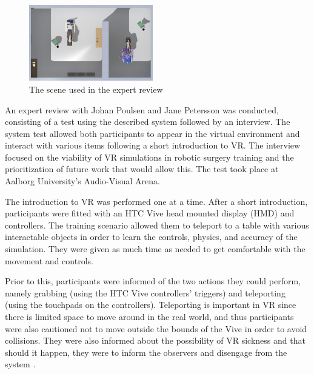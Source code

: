 \documentclass[conference]{IEEEtran}
\begin{document}
\begin{figure}[tp]
\centering
\includegraphics[width=0.48\textwidth]{Figures/Scene.PNG}
\caption{The scene used in the expert review}
\label{fig:scene}
\end{figure}

An expert review with Johan Poulsen and Jane Petersson was conducted, consisting of a test using the described system followed by an interview. The system test allowed both participants to appear in the virtual environment and interact with various items following a short introduction to VR. The interview focused on the viability of VR simulations in robotic surgery training and the prioritization of future work that would allow this. The test took place at Aalborg University's Audio-Visual Arena.

The introduction to VR was performed one at a time. After a short introduction, participants were fitted with an HTC Vive head mounted display (HMD) and controllers. The training scenario allowed them to teleport to a table with various interactable objects in order to learn the controls, physics, and accuracy of the simulation. They were given as much time as needed to get comfortable with the movement and controls.

Prior to this, participants were informed of the two actions they could perform, namely grabbing (using the HTC Vive controllers' triggers) and teleporting (using the touchpads on the controllers). Teleporting is important in VR since there is limited space to move around in the real world, and thus participants were also cautioned not to move outside the bounds of the Vive in order to avoid collisions. They were also informed about the possibility of VR sickness and that should it happen, they were to inform the observers and disengage from the system \citep{barrett_side_2004}.
\end{document}
